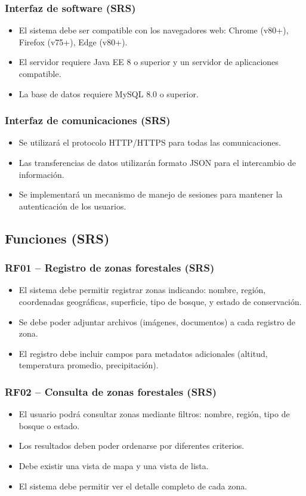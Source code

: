 \subsubsection{Interfaz de software (SRS)}
\begin{itemize}
\item El sistema debe ser compatible con los navegadores web: Chrome (v80+), Firefox (v75+), Edge (v80+).
\item El servidor requiere Java EE 8 o superior y un servidor de aplicaciones compatible.
\item La base de datos requiere MySQL 8.0 o superior.
\end{itemize}

\subsubsection{Interfaz de comunicaciones (SRS)}
\begin{itemize}
\item Se utilizará el protocolo HTTP/HTTPS para todas las comunicaciones.
\item Las transferencias de datos utilizarán formato JSON para el intercambio de información.
\item Se implementará un mecanismo de manejo de sesiones para mantener la autenticación de los usuarios.
\end{itemize}

\subsection{Funciones (SRS)}
\label{srs:ReqFuncionales}

\subsubsection{RF01 – Registro de zonas forestales (SRS)}
\begin{itemize}
\item El sistema debe permitir registrar zonas indicando: nombre, región, coordenadas geográficas, superficie, tipo de bosque, y estado de conservación.
\item Se debe poder adjuntar archivos (imágenes, documentos) a cada registro de zona.
\item El registro debe incluir campos para metadatos adicionales (altitud, temperatura promedio, precipitación).
\end{itemize}

\subsubsection{RF02 – Consulta de zonas forestales (SRS)}
\begin{itemize}
\item El usuario podrá consultar zonas mediante filtros: nombre, región, tipo de bosque o estado.
\item Los resultados deben poder ordenarse por diferentes criterios.
\item Debe existir una vista de mapa y una vista de lista.
\item El sistema debe permitir ver el detalle completo de cada zona.
\end{itemize}

